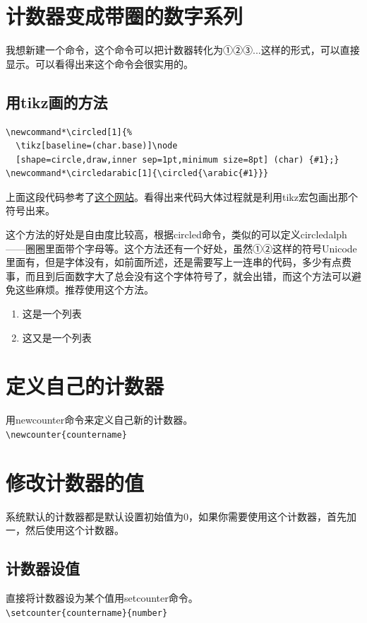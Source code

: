 \documentclass[11pt,oneside]{book}
\begin{document}
\section{计数器变成带圈的数字系列}
我想新建一个命令，这个命令可以把计数器转化为①②③...这样的形式，可以直接显示。可以看得出来这个命令会很实用的。

\subsection{用tikz画的方法}
\begin{Verbatim}
\newcommand*\circled[1]{%
  \tikz[baseline=(char.base)]\node
  [shape=circle,draw,inner sep=1pt,minimum size=8pt] (char) {#1};}
\newcommand*\circledarabic[1]{\circled{\arabic{#1}}}
\end{Verbatim}

上面这段代码参考了\href{http://tex.stackexchange.com/questions/133264/circled-footnote-symbols-with-pifont-showing-arrows-instead-of-circled-numbers}{这个网站}。看得出来代码大体过程就是利用tikz宏包画出那个符号出来。

这个方法的好处是自由度比较高，根据circled命令，类似的可以定义circledalph——圈圈里面带个字母等。这个方法还有一个好处，虽然①②这样的符号Unicode里面有，但是字体没有，如前面所述，还是需要写上一连串的代码，多少有点费事，而且到后面数字大了总会没有这个字体符号了，就会出错，而这个方法可以避免这些麻烦。推荐使用这个方法。

\begin{enumerate}
\renewcommand{\labelenumi}{\circledarabic{enumi}}
\item 这是一个列表
\item 这又是一个列表
\end{enumerate}

\section{定义自己的计数器}
用newcounter命令来定义自己新的计数器。\\
\verb+\newcounter{countername}+

\section{修改计数器的值}
系统默认的计数器都是默认设置初始值为0，如果你需要使用这个计数器，首先加一，然后使用这个计数器。
\subsection{计数器设值}
直接将计数器设为某个值用setcounter命令。\\
\verb+\setcounter{countername}{number}+
\end{document}
